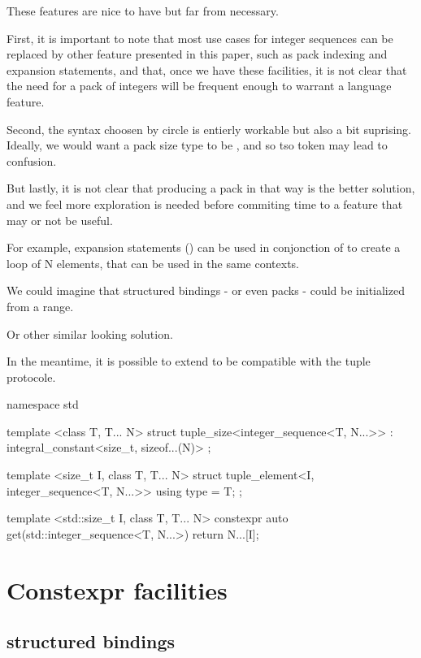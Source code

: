 \documentclass{wg21}
\begin{document}
These features are nice to have but far from necessary.

First, it is important to note that most use cases for integer sequences can be replaced by other feature presented in this paper,
such as pack indexing and expansion statements, and that, once we have these facilities, it is not clear that the need for a
pack of integers will be frequent enough to warrant a language feature.

Second, the syntax choosen by circle is entierly workable but also a bit suprising.
Ideally, we would want a pack size type to be , and so tso token  may lead to confusion.

But lastly, it is not clear that producing a pack in that way is the better solution, and we feel more exploration is needed
before commiting time to a feature that may or not be useful.

For example, expansion statements () can be used in conjonction of  to create a loop
of N elements, that can be used in the same contexts.

We could imagine that structured bindings - or even packs - could be initialized from a range.

Or other similar looking solution.

In the meantime, it is possible to extend  to be compatible with the tuple protocole.

\begin{colorblock}
namespace std {
    template <class T, T... N>
    struct tuple_size<integer_sequence<T, N...>>
    : integral_constant<size_t, sizeof...(N)>
    { };

    template <size_t I,  class T, T... N>
    struct tuple_element<I, integer_sequence<T, N...>> {
        using type = T;
    };

    template <std::size_t I,  class T, T... N>
    constexpr auto get(std::integer_sequence<T, N...>) {
        return N...[I];
    }
}
\end{colorblock}

\section{Constexpr facilities}

\subsection{ structured bindings}
\end{document}

